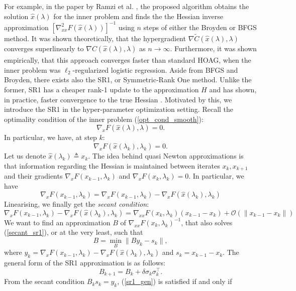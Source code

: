 \documentclass[11pt, twoside]{report}
\begin{document}
For example, in the paper by Ramzi et al. \cite{ramzi2022shine}, the proposed algorithm obtains the solution $\hat{x}(\lambda)$ for the inner problem and finds the the Hessian inverse  approximation $\left[ \nabla^2_{xx} F(\hat{x}(\lambda)) \right]^{-1}$ using $n$ steps of either the Broyden or BFGS method. It was shown theoretically, that the hypergradient $\nabla \tilde{C}(\hat{x}(\lambda), \lambda)$ converges superlinearly to $\nabla C(\hat{x}(\lambda), \lambda)$ as $n \xrightarrow[]{} \infty.$ Furthermore, it was shown empirically, that this approach converges faster than standard HOAG, when the inner problem was $\ell_2$-regularized logistic regression. Aside from BFGS and Broyden, there exists also the SR1, or Symmetric-Rank One method. Unlike the former, SR1 has a cheaper rank-1 update to the approximation $H$ and has shown, in practice, faster convergence to the true Hessian \cite{khalfan1993symmetric}. Motivated by this, we introduce the SR1 in the hyper-parameter optimization setting. Recall the optimality condition of the inner problem (\ref{opt_cond_smooth}):
\[\nabla_x F(\hat{x}(\lambda),\lambda) = 0.\]
In particular, we have, at step $k$:
\[\nabla_x F(\hat{x}(\lambda_k),\lambda_k) = 0.\]
Let us denote $\hat{x}(\lambda_{k}) \triangleq x_k$. The idea behind quasi Newton approximations is that information regarding the Hessian is maintained between iterates $x_k,x_{k+1}$ and their gradients $\nabla_x F(x_{k-1},\lambda_{k})$ and $\nabla_x F(x_{k},\lambda_{k}) = 0$. In particular, we have
\[\nabla_x F(x_{k-1},\lambda_{k}) = \nabla_x F(x_{k-1},\lambda_{k}) - \nabla_x F(\hat{x}(\lambda_k),\lambda_k)\]
Linearising, we finally get the \textit{secant condition}:
\begin{equation}\label{secant_sr1}
    \nabla_x F(x_{k-1},\lambda_{k}) - \nabla_x F(\hat{x}(\lambda_k),\lambda_k) = \nabla_{xx} F(x_{k},\lambda_{k})(x_{k-1} - x_k) + \mathcal{O}(\|x_{k-1} - x_k\|)
\end{equation}
We want to find an approximation $B$ of $\nabla_{xx} F(x_{k},\lambda_{k})^{-1}$, that also solves (\ref{secant_sr1}), or at the very least, such that
\[B = \min_{B} \|By_k - s_k\|,\]
where $y_k = \nabla_x F(x_{k-1},\lambda_{k}) - \nabla_x F(\hat{x}(\lambda_k),\lambda_k)$ and $s_k = x_{k-1} - x_k$. The general form of the SR1 approximation is as follows:
\begin{equation} \label{sr1_gen}
    B_{k+1} = B_{k} + \delta\sigma_k \sigma_k^\top.
\end{equation}
From the secant condition $B_k s_k = y_k$, (\ref{sr1_gen}) is satisfied if and only if \cite{nocedal2006numerical}
\end{document}
